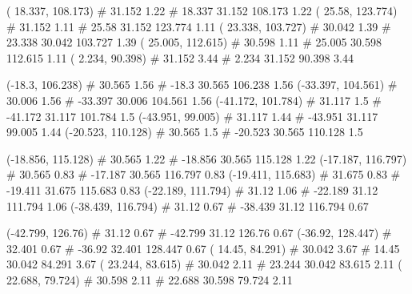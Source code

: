 \documentclass[a4paper,openbib,10pt]{article}
\newenvironment{treegraph}{\begin{graph}}{\end{graph}}
\begin{document}
\begin{treegraph}
  ( 18.337, 108.173) #     31.152    1.22
   #    18.337    31.152    108.173    1.22
  ( 25.58, 123.774) #     31.152    1.11
   #    25.58    31.152    123.774    1.11
  ( 23.338, 103.727) #     30.042    1.39
   #    23.338    30.042    103.727    1.39
  ( 25.005, 112.615) #     30.598    1.11
   #    25.005    30.598    112.615    1.11
  ( 2.234, 90.398) #     31.152    3.44
   #    2.234    31.152    90.398    3.44

  (-18.3, 106.238) #     30.565    1.56
   #    -18.3    30.565    106.238    1.56
  (-33.397, 104.561) #     30.006    1.56
   #    -33.397    30.006    104.561    1.56
  (-41.172, 101.784) #     31.117    1.5
   #    -41.172    31.117    101.784    1.5
  (-43.951, 99.005) #     31.117    1.44
   #    -43.951    31.117    99.005    1.44
  (-20.523, 110.128) #     30.565    1.5
   #    -20.523    30.565    110.128    1.5

  (-18.856, 115.128) #     30.565    1.22
   #    -18.856    30.565    115.128    1.22
  (-17.187, 116.797) #     30.565    0.83
   #    -17.187    30.565    116.797    0.83
  (-19.411, 115.683) #     31.675    0.83
   #    -19.411    31.675    115.683    0.83
  (-22.189, 111.794) #     31.12    1.06
   #    -22.189    31.12    111.794    1.06
  (-38.439, 116.794) #     31.12    0.67
   #    -38.439    31.12    116.794    0.67

  (-42.799, 126.76) #     31.12    0.67
   #    -42.799    31.12    126.76    0.67
  (-36.92, 128.447) #     32.401    0.67
   #    -36.92    32.401    128.447    0.67
  ( 14.45, 84.291) #     30.042    3.67
   #    14.45    30.042    84.291    3.67
  ( 23.244, 83.615) #     30.042    2.11
   #    23.244    30.042    83.615    2.11
  ( 22.688, 79.724) #     30.598    2.11
   #    22.688    30.598    79.724    2.11


\end{treegraph}
\end{document}
